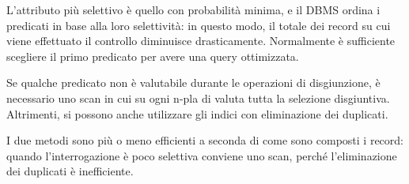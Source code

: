 L'attributo più selettivo è quello con probabilità minima, e il DBMS ordina i predicati in base alla loro selettività: in questo modo, il totale dei record su cui viene effettuato il controllo diminuisce drasticamente. Normalmente è sufficiente scegliere il primo predicato per avere una query ottimizzata. 

Se qualche predicato non è valutabile durante le operazioni di disgiunzione, è necessario uno scan in cui su ogni n-pla di valuta tutta la selezione disgiuntiva. Altrimenti, si possono anche utilizzare gli indici con eliminazione dei duplicati. 

I due metodi sono più o meno efficienti a seconda di come sono composti i record: quando l'interrogazione è poco selettiva conviene uno scan, perché l'eliminazione dei duplicati è inefficiente.

